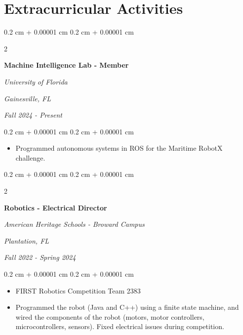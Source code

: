 \documentclass[10pt, letterpaper]{article}
\newenvironment{highlights}{
    \begin{itemize}[
        topsep=0.10 cm,
        parsep=0.10 cm,
        partopsep=0pt,
        itemsep=0pt,
        leftmargin=0.4 cm + 10pt
    ]
}{
    \end{itemize}
} %
\newenvironment{onecolentry}{
    \begin{adjustwidth}{
        0.2 cm + 0.00001 cm
    }{
        0.2 cm + 0.00001 cm
    }
}{
    \end{adjustwidth}
} %
\newenvironment{twocolentry}[2][]{
    \onecolentry
    \def\secondColumn{#2}
    \setcolumnwidth{\fill, 4.5 cm}
    \begin{paracol}{2}
}{
    \switchcolumn \raggedleft \secondColumn
    \end{paracol}
    \endonecolentry
} %
\begin{document}
    \section{Extracurricular Activities}

        
        \begin{twocolentry}{
        \textit{Gainesville, FL}    
            
        \textit{Fall 2024 - Present}}
            \textbf{Machine Intelligence Lab - Member}
            
            \textit{University of Florida}
        \end{twocolentry}

        \vspace{0.10 cm}
        \begin{onecolentry}
            \begin{highlights}
                \item Programmed autonomous systems in ROS for the Maritime RobotX challenge. 
            \end{highlights}
        \end{onecolentry}


        \vspace{0.2 cm}

        \begin{twocolentry}{
        \textit{Plantation, FL}    
            
        \textit{Fall 2022 - Spring 2024}}
            \textbf{Robotics - Electrical Director}
            
            \textit{American Heritage Schools - Broward Campus}
        \end{twocolentry}

        \vspace{0.10 cm}
        \begin{onecolentry}
            \begin{highlights}
                \item FIRST Robotics Competition Team 2383 
                \item Programmed the robot (Java and C++) using a finite state machine, and wired the components of the robot (motors, motor controllers, microcontrollers, sensors). Fixed electrical issues during competition. 
            \end{highlights}
        \end{onecolentry}

\end{document}
